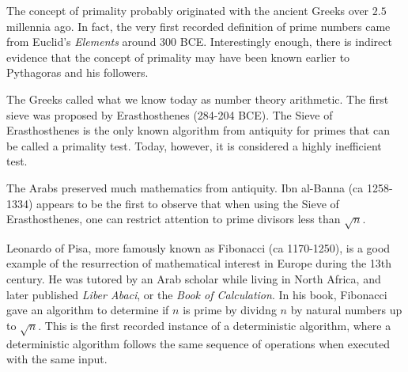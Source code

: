 \documentclass{article}
\begin{document}
\newpage




\begin{History}
\par The concept of primality probably originated with the ancient Greeks over $2.5$ millennia ago.
In fact, the very first recorded definition of prime numbers came from Euclid's \textit{Elements}
around 300 BCE. Interestingly enough, there is indirect evidence that the concept of primality
may have been known earlier to Pythagoras and his followers.

\par The Greeks called what we know today as number theory arithmetic. The first sieve was proposed
by Erasthosthenes (284-204 BCE). The Sieve of Erasthosthenes is the only known algorithm from
antiquity for primes that can be called a primality test. Today, however, it is considered a highly
inefficient test.

\par The Arabs preserved much mathematics from antiquity. Ibn al-Banna (ca 1258-1334) appears to be
the first to observe that when using the Sieve of Erasthosthenes, one can restrict attention to
prime divisors less than $\sqrt{n}$.

\par Leonardo of Pisa, more famously known as Fibonacci (ca 1170-1250), is a good example of the resurrection of
mathematical interest in Europe during the 13th century. He was tutored by an Arab scholar while living in
North Africa, and later published \textit{Liber Abaci}, or the \textit{Book of Calculation}. In his book,
Fibonacci gave an algorithm to determine if $n$ is prime  by dividng $n$ by natural numbers up to $\sqrt{n}$.
This is the first recorded instance of a deterministic algorithm, where a deterministic algorithm follows
the same sequence of operations when executed with the same input.
\end{History}
\end{document}
